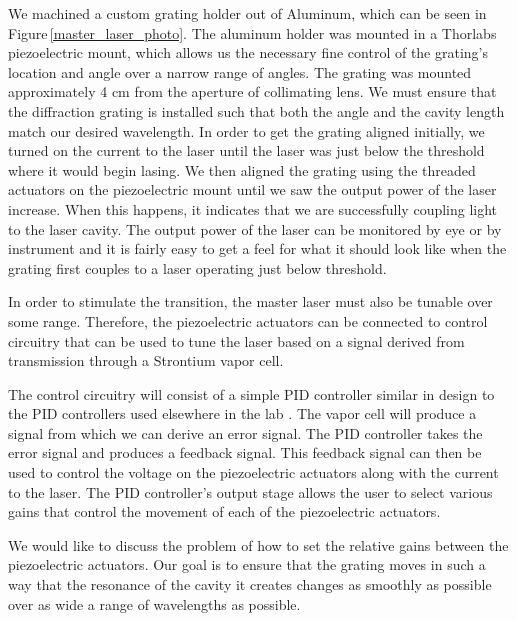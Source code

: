  We machined a custom grating holder out of Aluminum, which can be seen in Figure\,\ref{master_laser_photo}. The aluminum holder was mounted in a Thorlabs piezoelectric mount, which allows us the necessary fine control of the grating's location and angle over a narrow range of angles.  The grating was mounted approximately 4 cm from the aperture of collimating lens.
 We must ensure that the diffraction grating is installed such that both the angle and the cavity length match our desired wavelength. In order to get the grating aligned initially, we turned on the current to the laser until the laser was just below the threshold where it would begin lasing. We then aligned the grating using the threaded actuators on the piezoelectric mount until we saw the output power of the laser increase. When this happens, it indicates that we are successfully coupling light to the laser cavity. The output power of the laser can be monitored by eye or by instrument and it is fairly easy to get a feel for what it should look like when the grating first couples to a laser operating just below threshold.

In order to stimulate the transition, the master laser must also be tunable over some range. Therefore, the piezoelectric actuators can be connected to control circuitry that can be used to tune the laser based on a signal derived from transmission through a Strontium vapor cell. 

The control circuitry will consist of a simple PID controller similar in design to the PID controllers used elsewhere in the lab \cite{cjeDiss}. The vapor cell will produce a signal from which we can derive an error signal. The PID controller takes the error signal and produces a feedback signal. This feedback signal can then be used to control the voltage on the piezoelectric actuators along with the current to the laser. The PID controller's output stage allows the user to select various gains that control the movement of each of the piezoelectric actuators. 

We would like to discuss the problem of how to set the relative gains between the piezoelectric actuators. Our goal is to ensure that the grating moves in such a way that the resonance of the cavity it creates changes as smoothly as possible over as wide a range of wavelengths as possible. 

